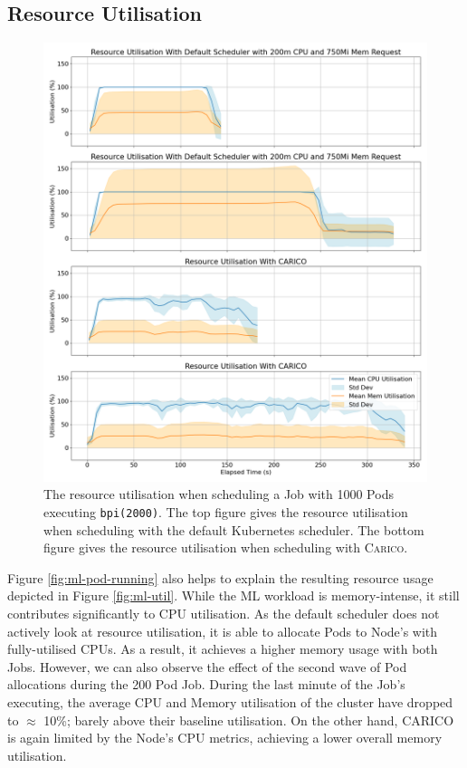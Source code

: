 \subsection{Resource Utilisation}
\begin{figure}[H]
    \centering
    \includegraphics[width=\textwidth]{images/ml-util.png}
    \caption{The resource utilisation when scheduling a Job with 1000 Pods
    executing \texttt{bpi(2000)}. The top figure gives the resource utilisation
    when scheduling with the default Kubernetes scheduler. The bottom figure
    gives the resource utilisation when scheduling with \textsc{Carico}.}
\end{figure}

Figure \ref{fig:ml-pod-running} also helps to explain the resulting resource usage
depicted in Figure \ref{fig:ml-util}. While the ML workload is memory-intense,
it still contributes significantly to CPU utilisation. As the default scheduler
does not actively look at resource utilisation, it is able to allocate Pods to
Node's with fully-utilised CPUs. As a result, it achieves a higher memory usage
with both Jobs. However, we can also observe the effect of the second wave of
Pod allocations during the 200 Pod Job. During the last minute of the Job's
executing, the average CPU and Memory utilisation of the cluster have dropped to
$\approx$ 10\%; barely above their baseline utilisation.
On the other hand, CARICO is again limited by the Node's CPU metrics, achieving
a lower overall memory utilisation.

